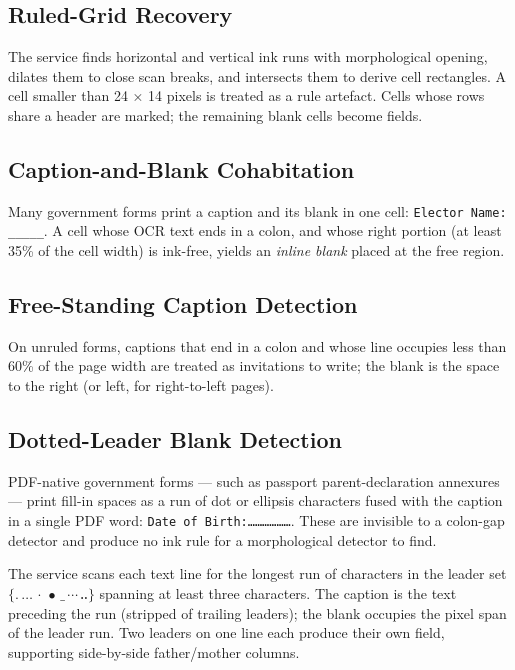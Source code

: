 \documentclass[conference]{IEEEtran}
\begin{document}
\subsection{Ruled-Grid Recovery}

The service finds horizontal and vertical ink runs with morphological opening, dilates them to close scan breaks, and intersects them to derive cell rectangles. A cell smaller than 24 × 14 pixels is treated as a rule artefact. Cells whose rows share a header are marked; the remaining blank cells become fields.

\subsection{Caption-and-Blank Cohabitation}

Many government forms print a caption and its blank in one cell: \texttt{Elector Name: \_\_\_\_\_}. A cell whose OCR text ends in a colon, and whose right portion (at least 35\% of the cell width) is ink-free, yields an \textit{inline blank} placed at the free region.

\subsection{Free-Standing Caption Detection}

On unruled forms, captions that end in a colon and whose line occupies less than 60\% of the page width are treated as invitations to write; the blank is the space to the right (or left, for right-to-left pages).

\subsection{Dotted-Leader Blank Detection}
\label{sec:dotleaders}

PDF-native government forms — such as passport parent-declaration annexures — print fill-in spaces as a run of dot or ellipsis characters fused with the caption in a single PDF word: \texttt{Date of Birth:………………}. These are invisible to a colon-gap detector and produce no ink rule for a morphological detector to find.

The service scans each text line for the longest run of characters in the leader set $\{.\,\ldots\,\cdot\,\bullet\,\_\,\text{⋯}\,\text{‥}\}$ spanning at least three characters. The caption is the text preceding the run (stripped of trailing leaders); the blank occupies the pixel span of the leader run. Two leaders on one line each produce their own field, supporting side-by-side father/mother columns.
\end{document}
